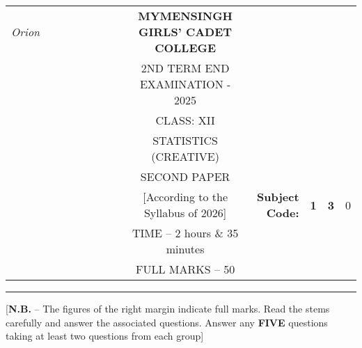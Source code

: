 \documentclass[12pt]{article}
\begin{document}
\begin{table}[]
\begin{tabular}{llllllllcllcl}
\textit{Orion} &  &  &  &  &  &  &  & \textbf{MYMENSINGH GIRLS’ CADET COLLEGE} &                                             &                                 & \multicolumn{1}{l}{}            &                        \\
                 &  &  &  &  &  &  &  & 2ND TERM END EXAMINATION - 2025          &                                             &                                 &                                 &                        \\
                 &  &  &  &  &  &  &  & CLASS: XII                               &                                             &                                 &                                 &                        \\
                 &  &  &  &  &  &  &  & STATISTICS (CREATIVE)                    &                                             &                                 &                                 &                        \\
                 &  &  &  &  &  &  &  & SECOND PAPER                             &                                             &                                 & \multicolumn{1}{r}{}            &                        \\ \cline{11-13} 
                 &  &  &  &  &  &  &  & [According to the Syllabus of 2026]      & \multicolumn{1}{r|}{\textbf{Subject Code:}} & \multicolumn{1}{l|}{\textbf{1}} & \multicolumn{1}{l|}{\textbf{3}} & \multicolumn{1}{l|}{0} \\ \cline{11-13} 
                 &  &  &  &  &  &  &  & TIME – 2 hours \& 35 minutes             &                                             &                                 & \multicolumn{1}{r}{}            &                        \\
                 &  &  &  &  &  &  &  & FULL MARKS – 50                          &                                             &                                 & \multicolumn{1}{r}{\textbf{}}   &                       
\end{tabular}
\end{table}


\hrule

\begin{center}
[\textbf{N.B.} – The figures of the right margin indicate full marks. Read the stems carefully and answer the associated questions. Answer any \textbf{FIVE} questions taking at least two questions from each group]\\
\end{center}
\end{document}
